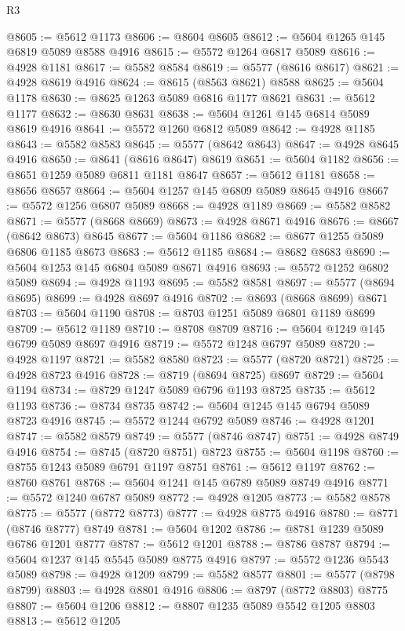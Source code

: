 \begin{lexlean}{R3}
\begin{coremodule}
@8605 := @5612 @1173
@8606 := @8604 @8605
@8612 := @5604 @1265 @145 @6819 @5089 @8588 @4916
@8615 := @5572 @1264 @6817 @5089
@8616 := @4928 @1181
@8617 := @5582 @8584
@8619 := @5577 (@8616 @8617)
@8621 := @4928 @8619 @4916
@8624 := @8615 (@8563 @8621) @8588
@8625 := @5604 @1178
@8630 := @8625 @1263 @5089 @6816 @1177 @8621
@8631 := @5612 @1177
@8632 := @8630 @8631
@8638 := @5604 @1261 @145 @6814 @5089 @8619 @4916
@8641 := @5572 @1260 @6812 @5089
@8642 := @4928 @1185
@8643 := @5582 @8583
@8645 := @5577 (@8642 @8643)
@8647 := @4928 @8645 @4916
@8650 := @8641 (@8616 @8647) @8619
@8651 := @5604 @1182
@8656 := @8651 @1259 @5089 @6811 @1181 @8647
@8657 := @5612 @1181
@8658 := @8656 @8657
@8664 := @5604 @1257 @145 @6809 @5089 @8645 @4916
@8667 := @5572 @1256 @6807 @5089
@8668 := @4928 @1189
@8669 := @5582 @8582
@8671 := @5577 (@8668 @8669)
@8673 := @4928 @8671 @4916
@8676 := @8667 (@8642 @8673) @8645
@8677 := @5604 @1186
@8682 := @8677 @1255 @5089 @6806 @1185 @8673
@8683 := @5612 @1185
@8684 := @8682 @8683
@8690 := @5604 @1253 @145 @6804 @5089 @8671 @4916
@8693 := @5572 @1252 @6802 @5089
@8694 := @4928 @1193
@8695 := @5582 @8581
@8697 := @5577 (@8694 @8695)
@8699 := @4928 @8697 @4916
@8702 := @8693 (@8668 @8699) @8671
@8703 := @5604 @1190
@8708 := @8703 @1251 @5089 @6801 @1189 @8699
@8709 := @5612 @1189
@8710 := @8708 @8709
@8716 := @5604 @1249 @145 @6799 @5089 @8697 @4916
@8719 := @5572 @1248 @6797 @5089
@8720 := @4928 @1197
@8721 := @5582 @8580
@8723 := @5577 (@8720 @8721)
@8725 := @4928 @8723 @4916
@8728 := @8719 (@8694 @8725) @8697
@8729 := @5604 @1194
@8734 := @8729 @1247 @5089 @6796 @1193 @8725
@8735 := @5612 @1193
@8736 := @8734 @8735
@8742 := @5604 @1245 @145 @6794 @5089 @8723 @4916
@8745 := @5572 @1244 @6792 @5089
@8746 := @4928 @1201
@8747 := @5582 @8579
@8749 := @5577 (@8746 @8747)
@8751 := @4928 @8749 @4916
@8754 := @8745 (@8720 @8751) @8723
@8755 := @5604 @1198
@8760 := @8755 @1243 @5089 @6791 @1197 @8751
@8761 := @5612 @1197
@8762 := @8760 @8761
@8768 := @5604 @1241 @145 @6789 @5089 @8749 @4916
@8771 := @5572 @1240 @6787 @5089
@8772 := @4928 @1205
@8773 := @5582 @8578
@8775 := @5577 (@8772 @8773)
@8777 := @4928 @8775 @4916
@8780 := @8771 (@8746 @8777) @8749
@8781 := @5604 @1202
@8786 := @8781 @1239 @5089 @6786 @1201 @8777
@8787 := @5612 @1201
@8788 := @8786 @8787
@8794 := @5604 @1237 @145 @5545 @5089 @8775 @4916
@8797 := @5572 @1236 @5543 @5089
@8798 := @4928 @1209
@8799 := @5582 @8577
@8801 := @5577 (@8798 @8799)
@8803 := @4928 @8801 @4916
@8806 := @8797 (@8772 @8803) @8775
@8807 := @5604 @1206
@8812 := @8807 @1235 @5089 @5542 @1205 @8803
@8813 := @5612 @1205

\end{coremodule}
\end{lexlean}
